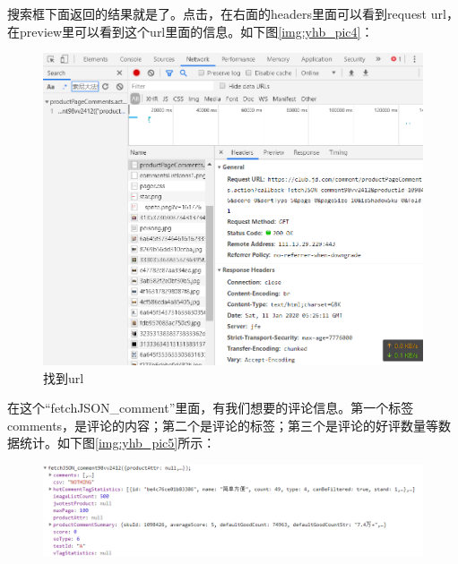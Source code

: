 搜索框下面返回的结果就是了。点击，在右面的headers里面可以看到request url，在preview里可以看到这个url里面的信息。如下图\ref{img:yhb_pic4}：
\begin{figure}[htbp]
\centering
\includegraphics[width=13.5cm]{find url jd.png}
\caption{找到url} %
\label{img:yhb_pict4}   %
\end{figure}

在这个“fetchJSON\_comment”里面，有我们想要的评论信息。第一个标签comments，是评论的内容；第二个是评论的标签；第三个是评论的好评数量等数据统计。如下图\ref{img:yhb_pic5}所示：
\begin{figure}[htbp]
\centering
\includegraphics[width=13.5cm]{json items jd.png}
\label{img:yhb_pict5}   %
\end{figure}



